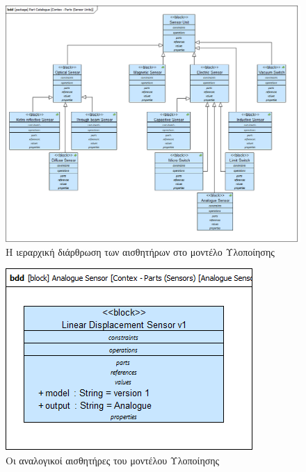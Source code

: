 \documentclass[a4paper,12pt,twoside]{report}
\begin{document}
{\begin{appendices}
				\begin{figure}[hp]
					\centering
					\includegraphics[scale=0.30]{DesignModel_Contex-Parts(SensorUnits).png}
					\caption{Η ιεραρχική διάρθρωση των αισθητήρων στο μοντέλο Υλοποίησης}
					\label{φωτ:Η ιεραρχική διάρθρωση των αισθητήρων στο μοντέλο Υλοποίησης}
				\end{figure}
				
				\begin{figure}[hp]
					\centering
					\includegraphics[scale=0.50]{DesignModel_Contex-Parts(Sensors)[AnalogueSensors].png}
					\caption{Οι αναλογικοί αισθητήρες του μοντέλου Υλοποίησης}
					\label{φωτ:Οι αναλογικοί αισθητήρες του μοντέλου Υλοποίησης}
				\end{figure}
				

\end{appendices}}
\end{document}
